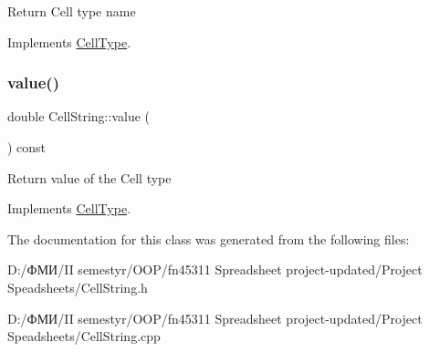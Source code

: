 Return Cell type name 

Implements \hyperlink{class_cell_type_ae31acfe1efc7776796d85918886247af}{Cell\+Type}.

\mbox{\label{class_cell_string_a452054b2d80356d66ed7504d7b1b8d69}} 
\subsubsection{\texorpdfstring{value()}{value()}}
{\footnotesize\ttfamily double Cell\+String\+::value (\begin{DoxyParamCaption}{ }\end{DoxyParamCaption}) const\hspace{0.3cm}{\ttfamily [virtual]}}

Return value of the Cell type 

Implements \hyperlink{class_cell_type_a6cbfc477f605049f2a007d8674442230}{Cell\+Type}.



The documentation for this class was generated from the following files\+:\begin{DoxyCompactItemize}
\item 
D\+:/ФМИ/\+I\+I semestyr/\+O\+O\+P/fn45311 Spreadsheet project-\/updated/\+Project Speadsheets/Cell\+String.\+h\item 
D\+:/ФМИ/\+I\+I semestyr/\+O\+O\+P/fn45311 Spreadsheet project-\/updated/\+Project Speadsheets/Cell\+String.\+cpp\end{DoxyCompactItemize}
